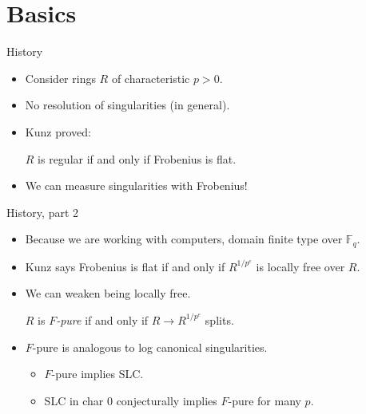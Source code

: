 \documentclass[xcolor=dvipsnames]{beamer}
\subtitle
{The {\tt TestIdeals} package for Macaulay2}
\author[BeBoBrElHeKaKaMaMaMoRoScSmTeWi] %
{Erin Bela, Alberto F. Boix, Juliette Bruce, Drew Ellingson, Daniel Hern\'andez, Zhibek Kadyrsizova, Mordechai Katzman, Sara Malec, Matthew Mastroeni, Maral Mostafazadehfard, Marcus Robinson, Karl Schwede\inst{1}, Daniel Smolkin, Pedro Teixeira, Emily Witt}
\institute[AMS Sectional Meeting, University of Arkansas] %
{
  \inst{1}%
  Department of Mathematics\\
  University of Utah}
\date[2018] %
{AMS Sectional Meeting, University of Arkansas\\2018}
\newcommand{\memph}[1]{{\color{Red}\emph{#1}}}
\newcommand{\bF}{\mathbb{F}}
\theoremstyle{remark}
\begin{document}
\begin{frame}
  \titlepage
\end{frame}






\section{Basics}

\begin{frame}[t]{History}
\begin{itemize}
\item<1-> Consider rings $R$ of characteristic $p > 0$.
\item<2-> No resolution of singularities (in general).
\item<3-> Kunz proved:
\vskip 3pt
\begin{theorem}[Kunz]
$R$ is regular if and only if Frobenius is flat.
\end{theorem}
\item<4->  We can measure singularities with Frobenius!
\end{itemize}
\end{frame}

\begin{frame}[t]{History, part 2}
\begin{itemize}
\item<1->  Because we are working with computers, domain finite type over $\bF_q$.
\item<2->  Kunz says Frobenius is flat if and only if $R^{1/p^e}$ is locally free over $R$.
\item<3->  We can weaken being locally free.
\begin{definition}
  $R$ is \memph{$F$-pure} if and only if $R \to R^{1/p^e}$ splits.
\end{definition}
\item<4->  $F$-pure is analogous to log canonical singularities.
\begin{itemize}
  \item<5->  $F$-pure implies SLC.
  \item<6->  SLC in char 0 conjecturally implies $F$-pure for many $p$.
\end{itemize}
\end{itemize}
\end{frame}
\end{document}
